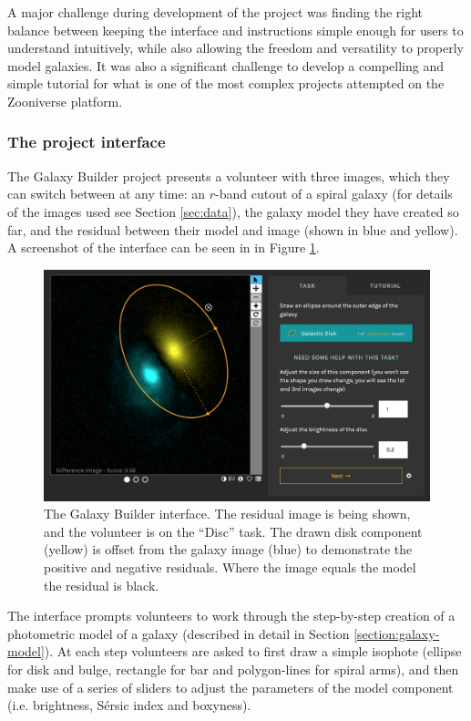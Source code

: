 \documentclass[../main.tex]{subfiles}
\begin{document}
A major challenge during development of the project was finding the right balance between keeping the interface and instructions simple enough for users to understand intuitively, while also allowing the freedom and versatility to properly model galaxies. It was also a significant challenge to develop a compelling and simple tutorial for what is one of the most complex projects attempted on the Zooniverse platform.

\subsubsection{The project interface}

The Galaxy Builder project presents a volunteer with three images, which they can switch between at any time: an $r$-band cutout of a spiral galaxy (for details of the images used see Section \ref{sec:data}), the galaxy model they have created so far, and the residual between their model and image (shown in blue and yellow). A screenshot of the interface can be seen in in Figure \ref{fig:interfaceInProgress}.

\begin{figure}
  \includegraphics[width=17.7cm]{images/interfaceInProgress.jpg}
  \caption{The Galaxy Builder interface. The residual image is being shown, and the volunteer is on the ``Disc'' task. The drawn disk component (yellow) is offset from the galaxy image (blue) to demonstrate the positive and negative residuals. Where the image equals the model the residual is black.}
  \label{fig:interfaceInProgress}
\end{figure}

The interface prompts volunteers to work through the step-by-step creation of a photometric model of a galaxy (described in detail in Section \ref{section:galaxy-model}). At each step volunteers are asked to first draw a simple isophote (ellipse for disk and bulge, rectangle for bar and polygon-lines for spiral arms), and then make use of a series of sliders to adjust the parameters of the model component (i.e. brightness, S\'ersic index and boxyness).
\end{document}
